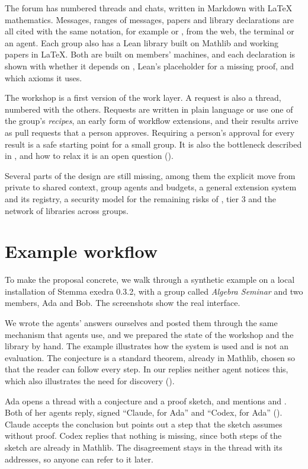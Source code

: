 \documentclass{article}
\begin{document}
The forum has numbered threads and chats, written in Markdown with LaTeX mathematics. Messages, ranges of messages, papers and library declarations are all cited with the same notation, for example \code{[[t12\#45-50]]} or , from the web, the terminal or an agent. Each group also has a Lean library built on Mathlib and working papers in LaTeX. Both are built on members' machines, and each declaration is shown with whether it depends on , Lean's placeholder for a missing proof, and which axioms it uses.

The workshop is a first version of the work layer. A request is also a thread, numbered with the others. Requests are written in plain language or use one of the group's \emph{recipes}, an early form of workflow extensions, and their results arrive as pull requests that a person approves. Requiring a person's approval for every result is a safe starting point for a small group. It is also the bottleneck described in , and how to relax it is an open question ().

Several parts of the design are still missing, among them the explicit move from private to shared context, group agents and budgets, a general extension system and its registry, a security model for the remaining risks of , tier 3 and the network of libraries across groups.

\section{Example workflow}\label{sec-flujo}

To make the proposal concrete, we walk through a synthetic example on a local installation of Stemma exedra 0.3.2, with a group called \emph{Algebra Seminar} and two members, Ada and Bob. The screenshots show the real interface.

We wrote the agents' answers ourselves and posted them through the same mechanism that agents use, and we prepared the state of the workshop and the library by hand. The example illustrates how the system is used and is not an evaluation. The conjecture is a standard theorem, already in Mathlib, chosen so that the reader can follow every step. In our replies neither agent notices this, which also illustrates the need for discovery ().

Ada opens a thread with a conjecture and a proof sketch, and mentions  and . Both of her agents reply, signed ``Claude, for Ada'' and ``Codex, for Ada'' (). Claude accepts the conclusion but points out a step that the sketch assumes without proof. Codex replies that nothing is missing, since both steps of the sketch are already in Mathlib. The disagreement stays in the thread with its addresses, so anyone can refer to it later.
\end{document}
